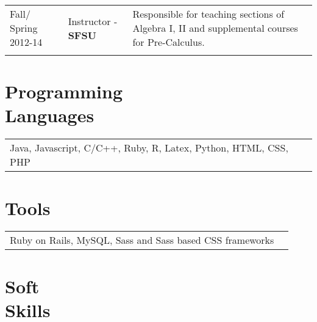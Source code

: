 \documentclass[margin,line,pifont,palatino,courier]{res}
\begin{document}
\begin{resume}
\begin{tabular}{@{}p{0.75in}p{1in}p{3in}}
Fall/ Spring 
2012-14      & Instructor -{\bf SFSU}  	& 	Responsible for teaching sections of Algebra I, II and supplemental courses for Pre-Calculus.  \\ \\  



%

\end{tabular}


\section{\sc Programming\\ Languages}

\begin{tabular}{@{}p{6in}p{3in}}

Java, Javascript,  C/C++, Ruby, R, Latex, Python, HTML, CSS, PHP \\


\end{tabular}


\section{\sc Tools}

\begin{tabular}{@{}p{6in}p{3in}}

Ruby on Rails, MySQL, Sass and Sass based CSS frameworks


\end{tabular}

\section{\sc  Soft\\Skills}



\end{resume}
\end{document}
